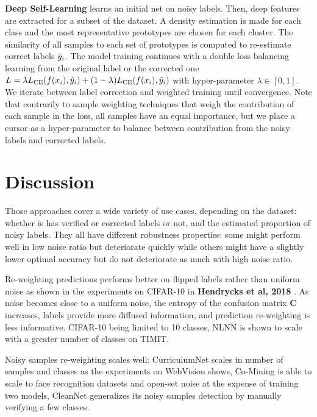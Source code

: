 \textbf{Deep Self-Learning} \citep{SelfLearning} learns an initial net on noisy labels. Then, deep features are extracted for a subset of the dataset. A density estimation is made for each class and the most representative prototypes are chosen for each cluster. The similarity of all samples to each set of prototypes is computed to re-estimate correct labels $\Tilde{y}_i$. The model training continues with a double loss balancing learning from the original label or the corrected one $L=\lambda L_\text{CE}(f(x_i), \hat{y}_i) + (1-\lambda)L_\text{CE}(f(x_i), \Tilde{y}_i)$ with hyper-parameter $\lambda \in [0,1]$. We iterate between label correction and weighted training until convergence. Note that contrarily to sample weighting techniques that weigh the contribution of each sample in the loss, all samples have an equal importance, but we place a cursor as a hyper-parameter to balance between contribution from the noisy labels and corrected labels.

\section{Discussion}

Those approaches cover a wide variety of use cases, depending on the dataset: whether is has verified or corrected labels or not, and the estimated proportion of noisy labels. They all have different robustness properties: some might perform well in low noise ratio but deteriorate quickly while others might have a slightly lower optimal accuracy but do not deteriorate as much with high noise ratio.

Re-weighting predictions performs better on flipped labels rather than uniform noise as shown in the experiments on CIFAR-10 in \textbf{Hendrycks et al, 2018} \citep{Trusted}. As noise becomes close to a uniform noise, the entropy of the confusion matrix $\textbf{C}$ increases, labels provide more diffused information, and prediction re-weighting is less informative. CIFAR-10 being limited to 10 classes, NLNN \citep{NLNN} is shown to scale with a greater number of classes on TIMIT.

Noisy samples re-weighting scales well: CurriculumNet \citep{CurriculumNet} scales in number of samples and classes as the experiments on WebVision shows, Co-Mining \citep{CoMining} is able to scale to face recognition datasets and open-set noise at the expense of training two models, CleanNet generalizes its noisy samples detection by manually verifying a few classes.

